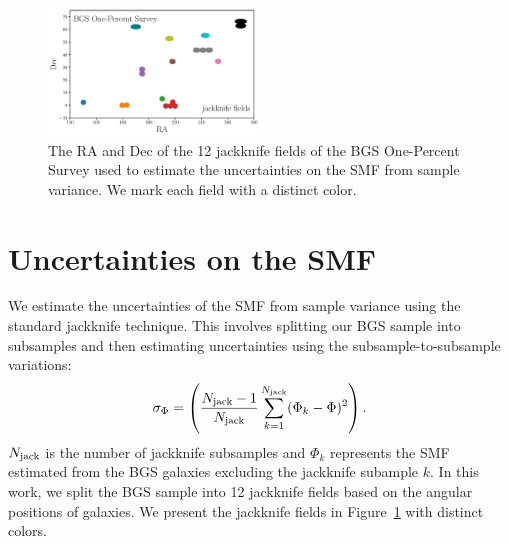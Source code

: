 
\begin{figure}
\begin{center}
    \includegraphics[width=0.5\textwidth]{figs/jackknife_fields.pdf} 
    \caption{
        The RA and Dec of the 12 jackknife fields of the BGS One-Percent Survey
        used to estimate the uncertainties on the SMF from sample variance. 
        We mark each field with a distinct color. 
    }\label{fig:jack}
\end{center}
\end{figure}


\section{Uncertainties on the SMF} \label{sec:jack}
We estimate the uncertainties of the SMF from sample variance using the
standard jackknife technique. 
This involves splitting our BGS sample into subsamples and then estimating
uncertainties using the subsample-to-subsample variations:  
\begin{equation} \label{eq:jack} 
    \sigma_\Phi = \left(\frac{N_{\rm jack}-1}{N_{\rm jack}}
    \sum\limits_{k=1}^{N_{\rm jack}} (\Phi_k - \Phi)^2 \right).
\end{equation} 
$N_{\rm jack}$ is the number of jackknife subsamples and $\Phi_k$ represents
the SMF estimated from the BGS galaxies excluding the jackknife subample $k$. 
In this work, we split the BGS sample into 12 jackknife fields based on the
angular positions of galaxies. 
We present the jackknife fields in Figure~\ref{fig:jack} with distinct colors. 
